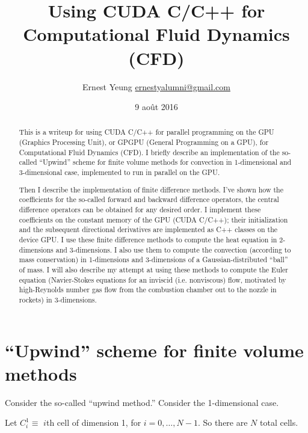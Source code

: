 \documentclass[10pt, landscape]{amsart}
\title{Using CUDA C/C++ for Computational Fluid Dynamics (CFD)}
\author{Ernest Yeung \href{mailto:ernestyalumni@gmail.com}{ernestyalumni@gmail.com}}
\date{9 ao\^{u}t 2016}
\begin{document}

\maketitle

\tableofcontents


\begin{abstract}
  This is a writeup for using CUDA C/C++ for parallel programming on the GPU (Graphics Processing Unit), or GPGPU (General Programming on a GPU), for Computational Fluid Dynamics (CFD).  I briefly describe an implementation of the so-called ``Upwind'' scheme for finite volume methods for convection in 1-dimensional and 3-dimensional case, implemented to run in parallel on the GPU.

  Then I describe the implementation of finite difference methods.  I've shown how the coefficients for the so-called forward and backward difference operators, the central difference operators can be obtained for any desired order.  I implement these coefficients on the constant memory of the GPU (CUDA C/C++); their initialization and the subsequent directional derivatives are implemented as C++ classes on the device GPU.  I use these finite difference methods to compute the heat equation in 2-dimensions and 3-dimensions.  I also use them to compute the convection (according to mass conservation) in 1-dimensions and 3-dimensions of a Gaussian-distributed ``ball'' of mass.  I will also describe my attempt at using these methods to compute the Euler equation (Navier-Stokes equations for an inviscid (i.e. nonviscous) flow, motivated by high-Reynolds number gas flow from the combustion chamber out to the nozzle in rockets) in 3-dimensions.  
\end{abstract}

\section{``Upwind'' scheme for finite volume methods}

Consider the so-called ``upwind method.''  Consider the 1-dimensional case.

Let $C_i^1 \equiv $ $i$th cell of dimension 1, for $i = 0, \dots , N-1$.  So there are $N$ total cells.
\end{document}
